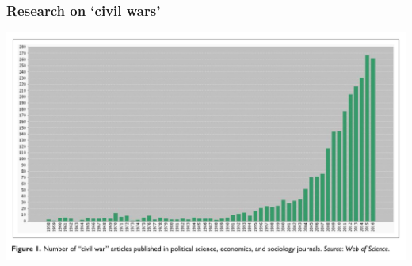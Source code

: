 \documentclass[utf8, xcolor=dvipsnames]{beamer}
\begin{document}
\begin{frame}
\frametitle{Research on `civil wars'}
\centering

\includegraphics[width = \textwidth]{img/cw_studies}

\end{frame}
\end{document}
